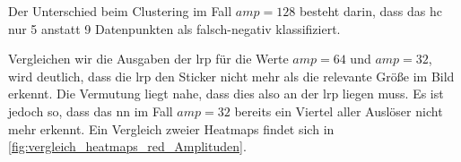 \documentclass[twoside, 12pt,a4paper]{book}
\numberwithin{equation}{section}
\begin{document}
	\begin{table}[!h]
		\caption{Ergebnisse der Detektion von LkPAs mit reduzierten Amplitudenstickern bei einem Anteil korrumpierter Daten von 33 Prozent.}
		\begin{center}
		\end{center}
	
		\label{tab:Ergebnisse_CLPA_reduced}
		
	\end{table}



\noindent Der Unterschied beim Clustering im Fall $amp=128$ besteht darin, dass das \ac{hc} nur 5 anstatt 9 Datenpunkten als falsch-negativ klassifiziert.
	
	
\noindent Vergleichen wir die Ausgaben der \ac{lrp} für die Werte ${amp=64}$ und ${amp=32}$, wird deutlich, dass die \ac{lrp} den Sticker nicht mehr als die relevante Größe im Bild erkennt. Die Vermutung liegt nahe, dass dies also an der \ac{lrp} liegen muss. Es ist jedoch so, dass das \ac{nn} im Fall $amp=32$ bereits ein Viertel aller Auslöser nicht mehr erkennt. Ein Vergleich zweier Heatmaps findet sich in \autoref{fig:vergleich_heatmaps_red_Amplituden}.
	
\end{document}

